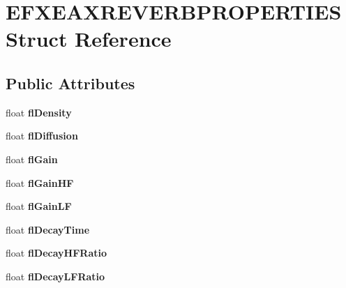 \hypertarget{structEFXEAXREVERBPROPERTIES}{}\section{E\+F\+X\+E\+A\+X\+R\+E\+V\+E\+R\+B\+P\+R\+O\+P\+E\+R\+T\+I\+ES Struct Reference}
\label{structEFXEAXREVERBPROPERTIES}
\subsection*{Public Attributes}
\begin{DoxyCompactItemize}
\item 
\mbox{\label{structEFXEAXREVERBPROPERTIES_ab5a3b61cca9851f8821eecf6c36d34e3}} 
float {\bfseries fl\+Density}
\item 
\mbox{\label{structEFXEAXREVERBPROPERTIES_a29c5efee127b72105f541e45faa7b9c9}} 
float {\bfseries fl\+Diffusion}
\item 
\mbox{\label{structEFXEAXREVERBPROPERTIES_a33180186f82371646a6474fb399e12ed}} 
float {\bfseries fl\+Gain}
\item 
\mbox{\label{structEFXEAXREVERBPROPERTIES_a74bfbe2a9a1eb17a424516981bdb97c2}} 
float {\bfseries fl\+Gain\+HF}
\item 
\mbox{\label{structEFXEAXREVERBPROPERTIES_a4f1d65608063341a491f257f7ae9168f}} 
float {\bfseries fl\+Gain\+LF}
\item 
\mbox{\label{structEFXEAXREVERBPROPERTIES_a3b46ec0674d758f0cafc704f31188991}} 
float {\bfseries fl\+Decay\+Time}
\item 
\mbox{\label{structEFXEAXREVERBPROPERTIES_a2d5a884d6b4e526e72a398796f9ca7f2}} 
float {\bfseries fl\+Decay\+H\+F\+Ratio}
\item 
\mbox{\label{structEFXEAXREVERBPROPERTIES_a5dc249af8c345b5a0b64fc932af2956c}} 
float {\bfseries fl\+Decay\+L\+F\+Ratio}

\end{DoxyCompactItemize}
